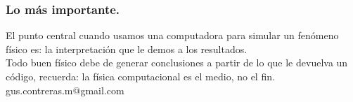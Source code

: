 \documentclass[12pt]{beamer}
\begin{document}
\begin{frame}
\frametitle{Lo más importante.}
El punto central cuando usamos una computadora para simular un fenómeno físico es: la interpretación que le demos a los resultados.
\\
\medskip
Todo buen físico debe de generar conclusiones a partir de lo que le devuelva un código, recuerda: la física computacional es el medio, no el fin.
\\
\medskip
gus.contreras.m@gmail.com
\end{frame}
\end{document}

